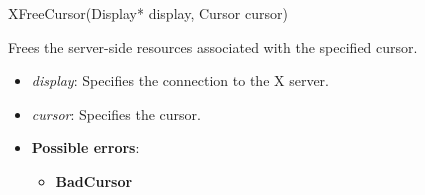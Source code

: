 \documentclass{report}
\begin{document}
\begin{itemize}
            \begin{cppcode}
                XFreeCursor(Display* display, Cursor cursor)
            \end{cppcode}
            \bigbreak \noindent
            Frees the server-side resources associated with the specified cursor.

            \begin{itemize}
                \item \textit{display}: Specifies the connection to the X server.
                \item \textit{cursor}: Specifies the cursor.
            \end{itemize}

            \begin{itemize}
                \item \textbf{Possible errors}:
                    \begin{itemize}
                        \item \textbf{BadCursor}
                    \end{itemize}
            \end{itemize}

    \end{itemize}
\end{document}
